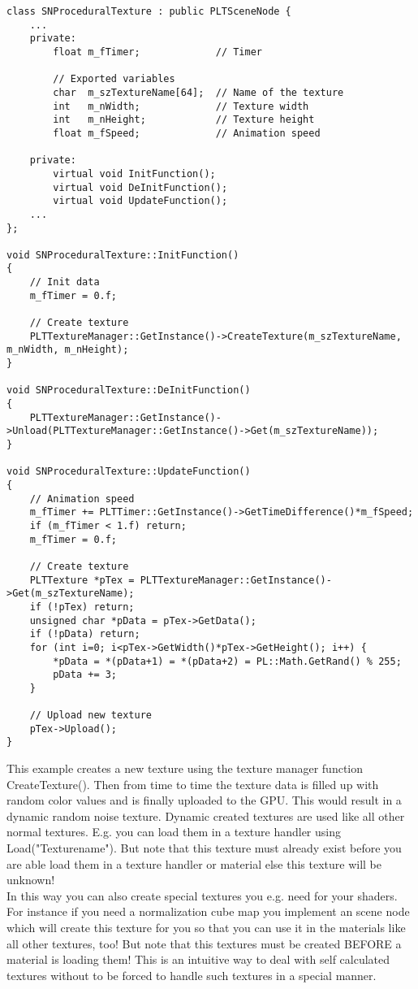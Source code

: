 \begin{lstlisting}[caption=Procedural texture class]
class SNProceduralTexture : public PLTSceneNode {
	...
	private:
		float m_fTimer;             // Timer

		// Exported variables
		char  m_szTextureName[64];  // Name of the texture
		int   m_nWidth;             // Texture width
		int   m_nHeight;            // Texture height
		float m_fSpeed;             // Animation speed

	private:
		virtual void InitFunction();
		virtual void DeInitFunction();
		virtual void UpdateFunction();
	...
};

void SNProceduralTexture::InitFunction()
{
	// Init data
	m_fTimer = 0.f;

	// Create texture
	PLTTextureManager::GetInstance()->CreateTexture(m_szTextureName, m_nWidth, m_nHeight);
}

void SNProceduralTexture::DeInitFunction()
{
	PLTTextureManager::GetInstance()->Unload(PLTTextureManager::GetInstance()->Get(m_szTextureName));
}

void SNProceduralTexture::UpdateFunction()
{
	// Animation speed
	m_fTimer += PLTTimer::GetInstance()->GetTimeDifference()*m_fSpeed;
	if (m_fTimer < 1.f) return;
	m_fTimer = 0.f;

	// Create texture
	PLTTexture *pTex = PLTTextureManager::GetInstance()->Get(m_szTextureName);
	if (!pTex) return;
	unsigned char *pData = pTex->GetData();
	if (!pData) return;
	for (int i=0; i<pTex->GetWidth()*pTex->GetHeight(); i++) {
		*pData = *(pData+1) = *(pData+2) = PL::Math.GetRand() % 255;
		pData += 3;
	}

	// Upload new texture
	pTex->Upload();
}
\end{lstlisting}

This example creates a new texture using the texture manager function CreateTexture(). Then from
time to time the texture data is filled up with random color values and is finally uploaded to the GPU.
This would result in a dynamic random noise texture. Dynamic created textures are used like all other normal
textures. E.g. you can load them in a texture handler using Load("Texturename"). But note that
this texture must already exist before you are able load them in a texture handler or material else
this texture will be unknown!\\
In this way you can also create special textures you e.g. need for your shaders. For instance
if you need a normalization cube map you implement an scene node which will create this texture for you
so that you can use it in the materials like all other textures, too! But note that this textures
must be created BEFORE a material is loading them! This is an intuitive way to deal with self calculated
textures without to be forced to handle such textures in a special manner.



